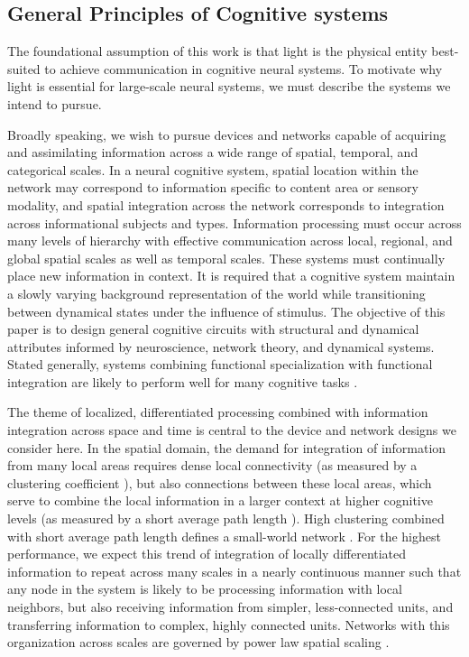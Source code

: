 \documentclass[twocolumn]{article}
\begin{document}
\subsection{\label{sec:cognitiveSystems}General Principles of Cognitive systems}
%
The foundational assumption of this work is that light is the physical entity best-suited to achieve communication in cognitive neural systems. To motivate why light is essential for large-scale neural systems, we must describe the systems we intend to pursue.

Broadly speaking, we wish to pursue devices and networks capable of acquiring and assimilating information across a wide range of spatial, temporal, and categorical scales. In a neural cognitive system, spatial location within the network may correspond to information specific to content area or sensory modality, and spatial integration across the network corresponds to integration across informational subjects and types. Information processing must occur across many levels of hierarchy with effective communication across local, regional, and global spatial scales as well as temporal scales. These systems must continually place new information in context. It is required that a cognitive system maintain a slowly varying background representation of the world while transitioning between dynamical states under the influence of stimulus. The objective of this paper is to design general cognitive circuits with structural and dynamical attributes informed by neuroscience, network theory, and dynamical systems. Stated generally, systems combining functional specialization with functional integration are likely to perform well for many cognitive tasks \cite{spto2000,spto2002}.

The theme of localized, differentiated processing combined with information integration \cite{toed1998,tosp2003,to2004,seiz2006,bato2008,bato2009,base2011} across space \cite{busp2009,sp2010} and time \cite{sase2001,vala2001,enfr2001,budr2004,bu2006} is central to the device and network designs we consider here. In the spatial domain, the demand for integration of information from many local areas requires dense local connectivity (as measured by a clustering coefficient \cite{eskn2015,saki2007,fa2007}), but also connections between these local areas, which serve to combine the local information in a larger context at higher cognitive levels \cite{brto2006} (as measured by a short average path length \cite{alba2002}). High clustering combined with short average path length defines a small-world network \cite{wast1998}. For the highest performance, we expect this trend of integration of locally differentiated information to repeat across many scales in a nearly continuous manner \cite{busp2009,sp2010} such that any node in the system is likely to be processing information with local neighbors, but also receiving information from simpler, less-connected units, and transferring information to complex, highly connected units. Networks with this organization across scales are governed by power law spatial scaling \cite{baal1999}.
\end{document}
